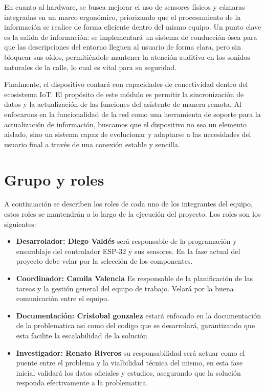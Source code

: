 \documentclass{article}
\begin{document}
En cuanto al hardware, se busca mejorar el uso de sensores físicos y cámaras integradas en un marco ergonómico, priorizando que el procesamiento de la información se realice de forma eficiente dentro del mismo equipo. Un punto clave es la salida de información: se implementará un sistema de conducción ósea para que las descripciones del entorno lleguen al usuario de forma clara, pero sin bloquear sus oídos, permitiéndole mantener la atención auditiva en los sonidos naturales de la calle, lo cual es vital para su seguridad.

Finalmente, el dispositivo contará con capacidades de conectividad dentro del ecosistema IoT. El propósito de este módulo es permitir la sincronización de datos y la actualización de las funciones del asistente de manera remota. Al enfocarnos en la funcionalidad de la red como una herramienta de soporte para la actualización de información, buscamos que el dispositivo no sea un elemento aislado, sino un sistema capaz de evolucionar y adaptarse a las necesidades del usuario final a través de una conexión estable y sencilla.

    

    \newpage
    \section{Grupo y roles}
    A continuación se describen los roles de cada uno de los integrantes del equipo, estos roles se mantendrán a lo largo de la ejecución del proyecto. Los roles son los siguientes:

    \begin{itemize}
        \item\textbf{Desarrolador: Diego Valdés} será responsable de la programación y ensamblaje del controlador ESP-32 y sus sensores. En la fase actual del proyecto debe velar por la selección de los componentes.
        \item\textbf{Coordinador: Camila Valencia} Es responsable de la planificación de las tareas y la gestión general del equipo de trabajo. Velará por la buena comunicación entre el equipo.
        \item\textbf{Documentación: Cristobal gonzalez} estará enfocado en la documentación de la problematica asi como del codigo que se desarrolará, garantizando que esta facilite la escalabilidad de la solución.
        \item\textbf{Investigador: Renato Riveros} su responsabilidad será actuar como el puente entre el problema y la vialbilidad técnica del mismo, en esta fase inicial validará los datos oficiales y estudios, asegurando que la solución responda efectivamente a la problematica.
    \end{itemize}
\end{document}
